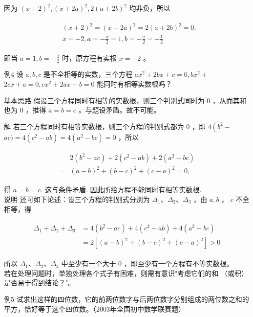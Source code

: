 \documentclass[10pt]{article}
\begin{document}
因为 $(x+2)^{2},(x+2 a)^{2}, 2(a+2 b)^{2}$ 均非负，所以

\begin{align*}
\begin{aligned}
& (x+2)^{2}=(x+2 a)^{2}=2(a+2 b)^{2}=0, \\
& x=-2, a=-\frac{x}{2}=1, b=-\frac{a}{2}=-\frac{1}{2}
\end{aligned}
\end{align*}

即当 $a=1, b=-\frac{1}{2}$ 时，原方程有实根 $x=-2$ 。

例4 设 $a, b, c$ 是不全相等的实数，三个方程 $a x^{2}+2 b x+c=0, b x^{2}+$ $2 c x+a=0, c x^{2}+2 a x+b=0$ 能同时有相等实数根吗？

基本思路 假设三个方程同时有相等的实数根，则三个判别式同时为 0 ，从而其和也为 0 ，推得 $a=b=c$ 。与题设矛盾。故不可能。

解 若三个方程同时有相等实数根，则三个方程的判别式都为 0 ，即 $4\left(b^{2}-\right.$ $a c)=4\left(c^{2}-a b\right)=4\left(a^{2}-b c\right)=0$ ，所以

\begin{align*}
\begin{aligned}
& 2\left(b^{2}-a c\right)+2\left(c^{2}-a b\right)+2\left(a^{2}-b c\right) \\
= & (a-b)^{2}+(b-c)^{2}+(c-a)^{2}=0,
\end{aligned}
\end{align*}

得 $a=b=c$. 这与条件矛盾. 因此所给方程不能同时有相等实数根.\\
说明 还可如下论述：设三个方程的判别式分别为 $\Delta_{1} 、 \Delta_{2} 、 \Delta_{3}$ ，由 $a, b$ ， $c$ 不全相等，得

\begin{align*}
\begin{aligned}
\Delta_{1}+\Delta_{2}+\Delta_{3} & =4\left(b^{2}-a c\right)+4\left(c^{2}-a b\right)+4\left(a^{2}-b c\right) \\
& =2\left[(a-b)^{2}+(b-c)^{2}+(c-a)^{2}\right]>0
\end{aligned}
\end{align*}

所以 $\Delta_{1} 、 \Delta_{2} 、 \Delta_{3}$ 中至少有一个大于 0 ，即至少有一个方程有不等实数根。\\
若在处理问题时，单独处理各个式子有困难，则需有意识"考虑它们的和 （或积）是否易于得到结论？"。

例5 试求出这样的四位数，它的前两位数字与后两位数字分别组成的两位数之和的平方，恰好等于这个四位数。（2003年全国初中数学联赛题）
\end{document}

